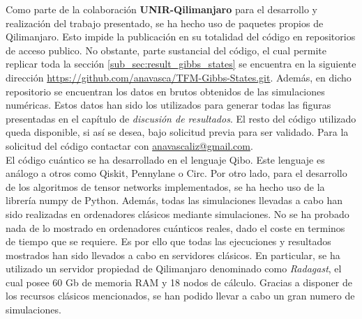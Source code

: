 Como parte de la colaboración \textbf{UNIR-Qilimanjaro} para el desarrollo y realización del trabajo presentado, se ha hecho uso de paquetes propios de Qilimanjaro. Esto impide la publicación en su totalidad del código en repositorios de acceso publico. No obstante, parte sustancial del código, el cual permite replicar toda la sección \ref{sub_sec:result_gibbs_states} se encuentra en la siguiente dirección \url{https://github.com/anavasca/TFM-Gibbs-States.git}. Además, en dicho repositorio se encuentran los datos en brutos obtenidos de las simulaciones numéricas. Estos datos han sido los utilizados para generar todas las figuras presentadas en el capítulo de \textit{discusión de resultados}. El resto del código utilizado queda disponible, si así se desea, bajo solicitud previa para ser validado. Para la solicitud del código contactar con \href{mailto:anavascaliz@gmail.com}{anavascaliz@gmail.com}. \\

El código cuántico se ha desarrollado en el lenguaje Qibo. Este lenguaje es análogo a otros como Qiskit, Pennylane o Circ. Por otro lado, para el desarrollo de los algoritmos de tensor networks implementados, se ha hecho uso de la librería numpy de Python. Además, todas las simulaciones llevadas a cabo han sido realizadas en ordenadores clásicos mediante simulaciones. No se ha probado nada de lo mostrado en ordenadores cuánticos reales, dado el coste en terminos de tiempo que se requiere. Es por ello que todas las ejecuciones y resultados mostrados han sido llevados a cabo en servidores clásicos. En particular, se ha utilizado un servidor propiedad de Qilimanjaro denominado como \textit{Radagast}, el cual posee 60 Gb de memoria RAM y 18 nodos de cálculo. Gracias a disponer de los recursos clásicos mencionados, se han podido llevar a cabo un gran numero de simulaciones. 